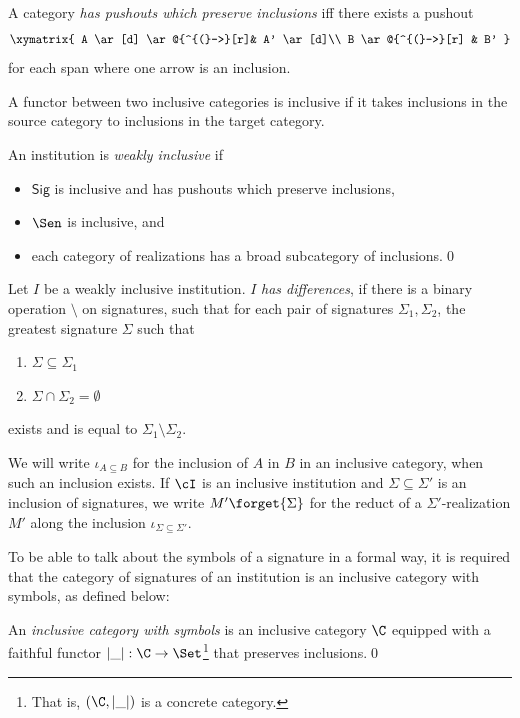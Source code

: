 \documentclass[10pt, a4paper]{isov2}
\newcommand{\Sig}{\mathsf{Sig}}
\begin{document}
\noindent
A category \emph{has pushouts which preserve inclusions} iff
there exists a pushout
%
\begin{equation*}
\xymatrix{
  A  \ar[d] \ar@{^{(}->}[r]& A' \ar[d]\\
  B \ar@{^{(}->}[r] & B'
}
\end{equation*}
%
for each span where one arrow is an inclusion.

A functor between two inclusive categories is inclusive if it takes inclusions in the source category to inclusions in the target category.

\begin{definition}
An institution is \emph{weakly inclusive} if
\begin{itemize}
  \item $\Sig$ is inclusive and has pushouts which preserve inclusions,
  \item $\Sen$ is inclusive, and
  \item each category of realizations has a broad subcategory of inclusions.\quad\qed
\end{itemize}
\end{definition}

Let $I$ be a weakly inclusive institution.  $I$  \emph{has differences}, if there is a binary operation $\setminus$ on signatures,
such that for each pair of signatures
$\Sigma_1, \Sigma_2$, the greatest signature $\Sigma$ such that
\begin{enumerate}
  \item $\Sigma \subseteq \Sigma_1$
  \item $\Sigma \cap \Sigma_2 = \emptyset$
\end{enumerate}
exists and is equal to $\Sigma_1\setminus \Sigma_2$.

We will write $\iota_{A\subseteq B}$ for the inclusion of $A$ in $B$ in an
inclusive category, when such an inclusion exists. If $\cI$ is an inclusive institution
and $\Sigma\subseteq\Sigma'$ is an inclusion of signatures, we write
$M'\forget{\Sigma}$ for the reduct of a $\Sigma'$-realization $M'$ along the inclusion
$\iota_{\Sigma\subseteq\Sigma'}$.

To be able to talk about the symbols of a signature in a formal way, it
is required that the category of signatures of an institution is an
inclusive category with symbols, as defined below:

\begin{definition}
An \emph{inclusive category with symbols} is an inclusive category
$\C$ equipped with a faithful functor $|\_|:\C\to\Set$\footnote{That is,
$(\C,|\_|)$ is a concrete category.} that preserves
inclusions.\quad\qed
\end{definition}
\end{document}
